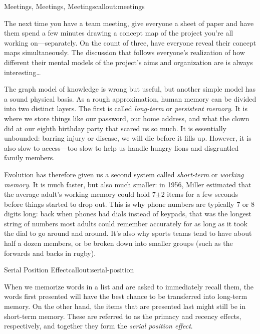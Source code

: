 \begin{callout}{Meetings, Meetings, Meetings}{callout:meetings}

The next time you have a team meeting, give everyone a sheet of paper
and have them spend a few minutes drawing a concept map of the project
you're all working on---separately. On the count of three, have
everyone reveal their concept maps simultaneously. The discussion that
follows everyone's realization of how different their mental models of
the project's aims and organization are is always interesting{\ldots}

\end{callout}


The graph model of knowledge is wrong but useful, but another simple
model has a sound physical basis.  As a rough approximation, human
memory can be divided into two distinct layers. The first is
called \emph{long-term} or \emph{persistent memory}. It is where we
store things like our password, our home address, and what the clown
did at our eighth birthday party that scared us so much. It is
essentially unbounded: barring injury or disease, we will die before
it fills up.  However, it is also slow to access---too slow to help us
handle hungry lions and disgruntled family members.

Evolution has therefore given us a second system
called \emph{short-term} or \emph{working memory}. It is much faster,
but also much smaller: in 1956, Miller estimated that the average
adult's working memory could hold 7$\pm$2 items for a few seconds
before things started to drop out. This is why phone numbers are
typically 7 or 8 digits long: back when phones had dials instead of
keypads, that was the longest string of numbers most adults could
remember accurately for as long as it took the dial to go around and
around. It's also why sports teams tend to have about half a dozen
members, or be broken down into smaller groups (such as the forwards
and backs in rugby).

\begin{callout}{Serial Position Effect}{callout:serial-position}

When we memorize words in a list and are asked to immediately recall
them, the words first presented will have the best chance to be
transferred into long-term memory. On the other hand, the items that
are presented last might still be in short-term memory. These are
referred to as the primacy and recency effects, respectively, and
together they form the \emph{serial position effect}.

\end{callout}

